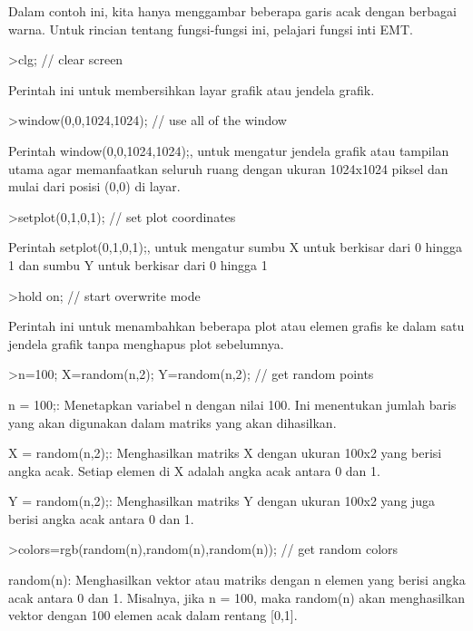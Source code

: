 \documentclass{article}
\begin{document}
\begin{eulernotebook}
\begin{eulercomment}
Dalam contoh ini, kita hanya menggambar beberapa garis acak dengan
berbagai warna. Untuk rincian tentang fungsi-fungsi ini, pelajari
fungsi inti EMT.
\end{eulercomment}
\begin{eulerprompt}
>clg; // clear screen
\end{eulerprompt}
\begin{eulercomment}
Perintah ini untuk membersihkan layar grafik atau jendela grafik.
\end{eulercomment}
\begin{eulerprompt}
>window(0,0,1024,1024); // use all of the window
\end{eulerprompt}
\begin{eulercomment}
Perintah window(0,0,1024,1024);, untuk mengatur jendela grafik atau
tampilan utama agar memanfaatkan seluruh ruang dengan ukuran 1024x1024
piksel dan mulai dari posisi (0,0) di layar.
\end{eulercomment}
\begin{eulerprompt}
>setplot(0,1,0,1); // set plot coordinates
\end{eulerprompt}
\begin{eulercomment}
Perintah setplot(0,1,0,1);, untuk mengatur sumbu X untuk berkisar dari
0 hingga 1 dan sumbu Y untuk berkisar dari 0 hingga 1
\end{eulercomment}
\begin{eulerprompt}
>hold on; // start overwrite mode
\end{eulerprompt}
\begin{eulercomment}
Perintah ini untuk menambahkan beberapa plot atau elemen grafis ke
dalam satu jendela grafik tanpa menghapus plot sebelumnya.
\end{eulercomment}
\begin{eulerprompt}
>n=100; X=random(n,2); Y=random(n,2);  // get random points
\end{eulerprompt}
\begin{eulercomment}
n = 100;: Menetapkan variabel n dengan nilai 100. Ini menentukan
jumlah baris yang akan digunakan dalam matriks yang akan dihasilkan.

X = random(n,2);: Menghasilkan matriks X dengan ukuran 100x2 yang
berisi angka acak. Setiap elemen di X adalah angka acak antara 0 dan
1.

Y = random(n,2);: Menghasilkan matriks Y dengan ukuran 100x2 yang juga
berisi angka acak antara 0 dan 1.
\end{eulercomment}
\begin{eulerprompt}
>colors=rgb(random(n),random(n),random(n)); // get random colors
\end{eulerprompt}
\begin{eulercomment}
random(n): Menghasilkan vektor atau matriks dengan n elemen yang
berisi angka acak antara 0 dan 1. Misalnya, jika n = 100, maka
random(n) akan menghasilkan vektor dengan 100 elemen acak dalam
rentang [0,1].


\end{eulercomment}
\end{eulernotebook}
\end{document}

